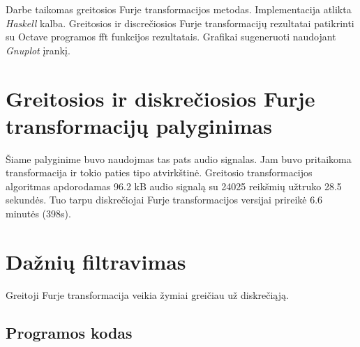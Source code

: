 \documentclass[a4paper,12pt,fleqn]{article}
\begin{document}
    {}{}{}{}%
    {}

    \tableofcontents

    Darbe taikomas greitosios Furje transformacijos metodas.
    Implementacija atlikta \textit{Haskell} kalba.
    Greitosios ir discrečiosios Furje transformacijų rezultatai patikrinti su Octave programos fft funkcijos rezultatais.
    Grafikai sugeneruoti naudojant \textit{Gnuplot} įrankį.

    \section{Greitosios ir diskrečiosios Furje transformacijų palyginimas}
    \label{sec:dftVsFft}

    Šiame palyginime buvo naudojmas tas pats audio signalas.
    Jam buvo pritaikoma transformacija ir tokio paties tipo atvirkštinė.
    Greitosio transformacijos algoritmas apdorodamas 96.2 kB audio signalą su 24025 reikšmių užtruko 28.5 sekundės.
    Tuo tarpu diskrečiojai Furje transformacijos versijai prireikė 6.6 minutės (398s).\cite{signals}


    \section{Dažnių filtravimas}
    \label{sec:filtering}




    Greitoji Furje transformacija veikia žymiai greičiau už diskrečiąją.




    \newpage
    \begin{appendices}
        \section{Programos kodas}
        \label{app:code}
        
        
    \end{appendices}
\end{document}
